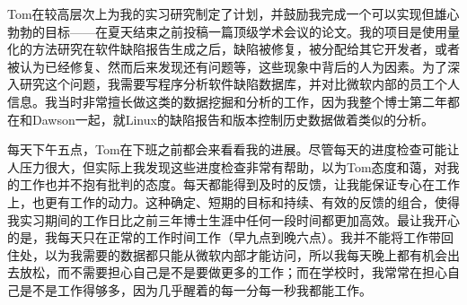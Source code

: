 \documentclass[letter,12pt]{book}
\begin{document}
\begin{CJK}{UTF8}{gbsn}
\breakline

Tom在较高层次上为我的实习研究制定了计划，并鼓励我完成一个可以实现但雄心勃勃的目标——在夏天结束之前投稿一篇顶级学术会议的论文。我的项目是使用量化的方法研究在软件缺陷报告生成之后，缺陷被修复，被分配给其它开发者，或者被认为已经修复、然而后来发现还有问题等，这些现象中背后的人为因素。为了深入研究这个问题，我需要写程序分析软件缺陷数据库，并对比微软内部的员工个人信息。我当时非常擅长做这类的数据挖掘和分析的工作，因为我整个博士第二年都在和Dawson一起，就Linux的缺陷报告和版本控制历史数据做着类似的分析。

每天下午五点，Tom在下班之前都会来看看我的进展。尽管每天的进度检查可能让人压力很大，但实际上我发现这些进度检查非常有帮助，以为Tom态度和蔼，对我的工作也并不抱有批判的态度。每天都能得到及时的反馈，让我能保证专心在工作上，也更有工作的动力。这种确定、短期的目标和持续、有效的反馈的组合，使得我实习期间的工作日比之前三年博士生涯中任何一段时间都更加高效。最让我开心的是，我每天只在正常的工作时间工作（早九点到晚六点）。我并不能将工作带回住处，以为我需要的数据都只能从微软内部才能访问，所以我每天晚上都有机会出去放松，而不需要担心自己是不是要做更多的工作；而在学校时，我常常在担心自己是不是工作得够多，因为几乎醒着的每一分每一秒我都能工作。







\clearpage
\clearpage

\end{CJK}
\end{document}
